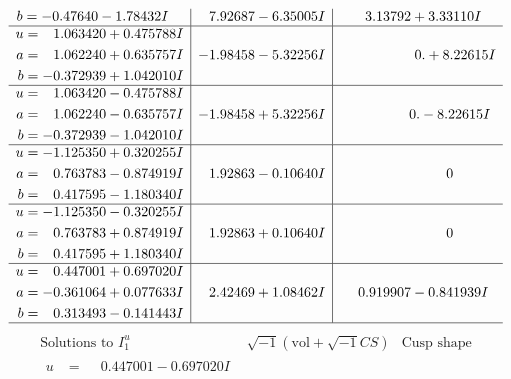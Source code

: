 \documentclass[1p]{elsarticle_modified}
\theoremstyle{definition}
\newcommand{\I}{\sqrt{-1}}
\begin{document}
$$\begin{array}{c|c|c}
\begin{aligned}
b &= -0.47640 - 1.78432 I\end{aligned}
 & \phantom{-}7.92687 - 6.35005 I & \phantom{-}3.13792 + 3.33110 I \\ \hline\begin{aligned}
u &= \phantom{-}1.063420 + 0.475788 I \\
a &= \phantom{-}1.062240 + 0.635757 I \\
b &= -0.372939 + 1.042010 I\end{aligned}
 & -1.98458 - 5.32256 I & \phantom{-0.000000 -}0. + 8.22615 I \\ \hline\begin{aligned}
u &= \phantom{-}1.063420 - 0.475788 I \\
a &= \phantom{-}1.062240 - 0.635757 I \\
b &= -0.372939 - 1.042010 I\end{aligned}
 & -1.98458 + 5.32256 I & \phantom{-0.000000 } 0. - 8.22615 I \\ \hline\begin{aligned}
u &= -1.125350 + 0.320255 I \\
a &= \phantom{-}0.763783 - 0.874919 I \\
b &= \phantom{-}0.417595 - 1.180340 I\end{aligned}
 & \phantom{-}1.92863 - 0.10640 I & \phantom{-0.000000 } 0 \\ \hline\begin{aligned}
u &= -1.125350 - 0.320255 I \\
a &= \phantom{-}0.763783 + 0.874919 I \\
b &= \phantom{-}0.417595 + 1.180340 I\end{aligned}
 & \phantom{-}1.92863 + 0.10640 I & \phantom{-0.000000 } 0 \\ \hline\begin{aligned}
u &= \phantom{-}0.447001 + 0.697020 I \\
a &= -0.361064 + 0.077633 I \\
b &= \phantom{-}0.313493 - 0.141443 I\end{aligned}
 & \phantom{-}2.42469 + 1.08462 I & \phantom{-}0.919907 - 0.841939 I\\
 \hline 
 \end{array}$$\newpage$$\begin{array}{c|c|c}  
\text{Solutions to }I^u_{1}& \I (\text{vol} + \sqrt{-1}CS) & \text{Cusp shape}\\
 \hline 
\begin{aligned}
u &= \phantom{-}0.447001 - 0.697020 I \\

\end{aligned}
\end{array}$$
\end{document}
